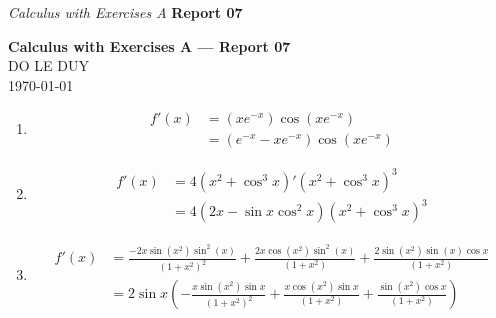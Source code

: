 
\newcommand{\myclass}{Calculus with Exercises A}
\newcommand{\myname}{DO LE DUY}
\newcommand{\myhwtype}{Report 07}
\newcommand{\questiontype}{Problem}
\newcommand{\writtensection}{7}
\headrule
\header{{\myname}}%
{\emph{\myclass}}%
{\textbf{\myhwtype }}
\DeclareMathOperator{\arcsec}{arcsec}

\thispagestyle{empty}
\begin{center}
  {\Large \textbf{\myclass{} — \myhwtype{} }} \\
  {\myname{} } \\
  \today
\end{center}

\begin{numedquestion}
  
\begin{enumerate}[label={(\arabic*)}]
    \setcounter{enumi}{0}
  \item 
  \begin{align*}
  f'(x) &= (xe^{-x})\cos(xe^{-x}) \\
  &= (e^{-x} - xe^{-x})\cos(xe^{-x})
  \end{align*}
  \item 
  \begin{align*}
  f'(x) &= 4(x^2 + \cos^3 x)'(x^2 + \cos^3 x)^3 \\
  &= 4(2x - \sin x \cos^2 x)(x^2 + \cos^3 x)^3
  \end{align*}
  \item 
  \begin{align*}
  f'(x) &= \frac{-2x \sin(x^2)\sin^2(x)}{(1 + x^2)^2} + \frac{2x \cos(x^2)\sin^2(x)}{(1 + x^2)} + \frac{ 2\sin(x^2)\sin(x)\cos x}{(1 + x^2)} \\
  &= 2 \sin x\left(-\frac{x \sin(x^2)\sin x }{(1 + x^2)^2} + \frac{x \cos(x^2)\sin x}{(1 + x^2)} + \frac{ \sin(x^2)\cos x}{(1 + x^2)}\right)
  \end{align*}
\end{enumerate}
\end{numedquestion}

